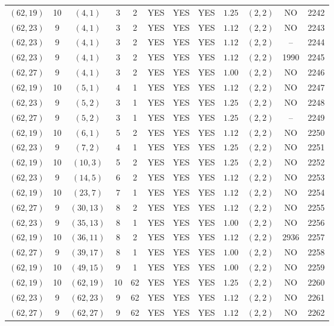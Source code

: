 \begin{longtable}{|c|c|c|c|c|c|c|c|c|c|c|c|}
$(62,19)$ & 10 & $(4,1)$ & 3 & 2 & YES & YES & YES & $1.25$ & $(2,2)$ & NO & 2242\\
$(62,23)$ & 9 & $(4,1)$ & 3 & 2 & YES & YES & YES & $1.12$ & $(2,2)$ & NO & 2243\\
$(62,23)$ & 9 & $(4,1)$ & 3 & 2 & YES & YES & YES & $1.12$ & $(2,2)$ & -- & 2244\\
$(62,23)$ & 9 & $(4,1)$ & 3 & 2 & YES & YES & YES & $1.12$ & $(2,2)$ & 1990 & 2245\\
$(62,27)$ & 9 & $(4,1)$ & 3 & 2 & YES & YES & YES & $1.00$ & $(2,2)$ & NO & 2246\\
$(62,19)$ & 10 & $(5,1)$ & 4 & 1 & YES & YES & YES & $1.12$ & $(2,2)$ & NO & 2247\\
$(62,23)$ & 9 & $(5,2)$ & 3 & 1 & YES & YES & YES & $1.25$ & $(2,2)$ & NO & 2248\\
$(62,27)$ & 9 & $(5,2)$ & 3 & 1 & YES & YES & YES & $1.25$ & $(2,2)$ & -- & 2249\\
$(62,19)$ & 10 & $(6,1)$ & 5 & 2 & YES & YES & YES & $1.12$ & $(2,2)$ & NO & 2250\\
$(62,23)$ & 9 & $(7,2)$ & 4 & 1 & YES & YES & YES & $1.25$ & $(2,2)$ & NO & 2251\\
$(62,19)$ & 10 & $(10,3)$ & 5 & 2 & YES & YES & YES & $1.25$ & $(2,2)$ & NO & 2252\\
$(62,23)$ & 9 & $(14,5)$ & 6 & 2 & YES & YES & YES & $1.12$ & $(2,2)$ & NO & 2253\\
$(62,19)$ & 10 & $(23,7)$ & 7 & 1 & YES & YES & YES & $1.12$ & $(2,2)$ & NO & 2254\\
$(62,27)$ & 9 & $(30,13)$ & 8 & 2 & YES & YES & YES & $1.12$ & $(2,2)$ & NO & 2255\\
$(62,23)$ & 9 & $(35,13)$ & 8 & 1 & YES & YES & YES & $1.00$ & $(2,2)$ & NO & 2256\\
$(62,19)$ & 10 & $(36,11)$ & 8 & 2 & YES & YES & YES & $1.12$ & $(2,2)$ & 2936 & 2257\\
$(62,27)$ & 9 & $(39,17)$ & 8 & 1 & YES & YES & YES & $1.00$ & $(2,2)$ & NO & 2258\\
$(62,19)$ & 10 & $(49,15)$ & 9 & 1 & YES & YES & YES & $1.00$ & $(2,2)$ & NO & 2259\\
$(62,19)$ & 10 & $(62,19)$ & 10 & 62 & YES & YES & YES & $1.25$ & $(2,2)$ & NO & 2260\\
$(62,23)$ & 9 & $(62,23)$ & 9 & 62 & YES & YES & YES & $1.12$ & $(2,2)$ & NO & 2261\\
$(62,27)$ & 9 & $(62,27)$ & 9 & 62 & YES & YES & YES & $1.12$ & $(2,2)$ & NO & 2262\\

\end{longtable}
